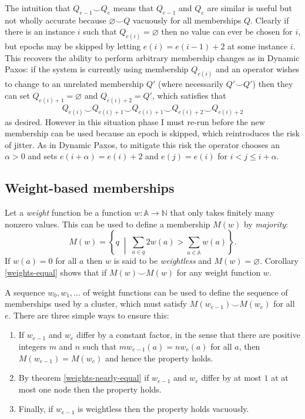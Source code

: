 \documentclass[journal]{IEEEtran}
\begin{document}
The intuition that $Q_{e-1} \smile Q_e$ means that $Q_{e-1}$ and $Q_e$ are
similar is useful but not wholly accurate because $\varnothing \smile Q$
vacuously for all memberships $Q$. Clearly if there is an instance $i$ such
that $Q_{e(i)} = \varnothing$ then no value can ever be chosen for $i$, but
epochs may be skipped by letting $e(i) = e(i-1) + 2$ at some instance $i$.
This recovers the ability to perform arbitrary membership changes as in Dynamic
Paxos: if the system is currently using membership $Q_{e(i)}$ and an operator
wishes to change to an unrelated membership $Q'$ (where necessarily $Q' \smile
Q'$) then they can set $Q_{e(i)+1} = \varnothing$ and $Q_{e(i)+2} = Q'$, which
satisfies that \[Q_{e(i)} \smile Q_{e(i) + 1} \smile Q_{e(i)+1} \smile Q_{e(i)
+ 2} \smile Q_{e(i) + 2}\] as desired. However in this situation phase I must
re-run before the new membership can be used because an epoch is skipped, which
reintroduces the risk of jitter. As in Dynamic Paxos, to mitigate this risk the
operator chooses an $\alpha > 0$ and sets $e(i+\alpha) = e(i)+2$ and $e(j) =
e(i)$ for $i < j \le i + \alpha$.

\subsection{Weight-based memberships}
\label{weight-based-memberships}

Let a \textit{weight} function be a function $w : \mathbb A \to \mathbb N$ that
only takes finitely many nonzero values. This can be used to define a
membership $M(w)$ by \textit{majority}: \[M(w) = \left\{ q \;\middle|\; \sum_{a
\in q} 2 w(a) > \sum_{a \in \mathbb A} w(a) \right\}.\] If $w(a) = 0$ for all
$a$ then $w$ is said to be \textit{weightless} and $M(w) = \varnothing$.
Corollary \ref{weights-equal} shows that if $M(w) \smile M(w)$ for any weight
function $w$.

A sequence $w_0, w_1, \ldots$ of weight functions can be used to define the
sequence of memberships used by a cluster, which must satisfy $M(w_{e-1})
\smile M(w_e)$ for all $e$.  There are three simple ways to ensure this:

\begin{enumerate}

\item If $w_{e-1}$ and $w_e$ differ by a constant factor, in the sense that
there are positive integers $m$ and $n$ such that $m w_{e-1}(a) = n w_e(a)$
for all $a$, then $M(w_{e-1}) = M(w_e)$ and hence the property holds.

\item By theorem \ref{weights-nearly-equal} if $w_{e-1}$ and $w_e$
differ by at most $1$ at at most one node then the property holds.

\item Finally, if $w_{e-1}$ is weightless then the property holds vacuously.

\end{enumerate}
\end{document}
